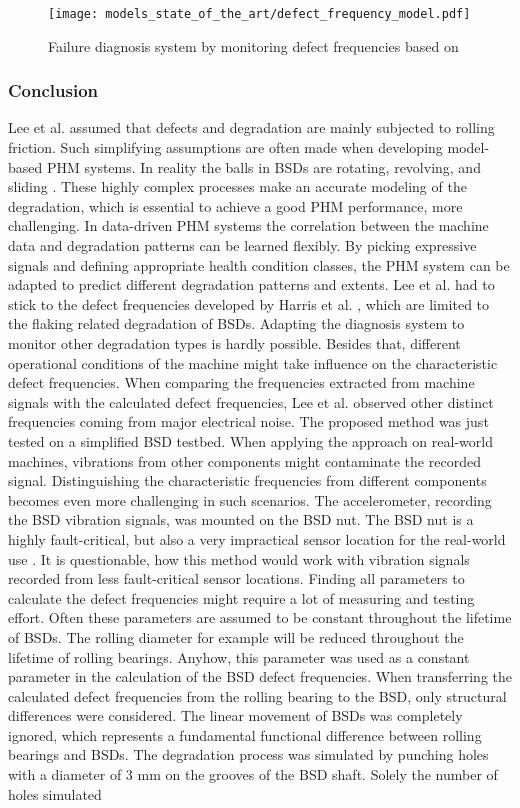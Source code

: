 \begin{figure}[H]
  \centering
  \texttt{[image: models\_state\_of\_the\_art/defect\_frequency\_model.pdf]}
  \caption{Failure diagnosis system by monitoring defect frequencies based on \cite{Lee2015}}
  \label{fig:defect_frequency_model}
\end{figure}

\subsubsection{Conclusion}
Lee et al. \cite{Lee2015} assumed that defects and degradation are mainly subjected to rolling friction. Such simplifying assumptions are often made when developing model-based PHM systems. In reality the balls in BSDs are rotating, revolving, and sliding \cite{Lee2015}. These highly complex processes make an accurate modeling of the degradation, which is essential to achieve a good PHM performance, more challenging. In data-driven PHM systems the correlation between the machine data and degradation patterns can be learned flexibly. By picking expressive signals and defining appropriate health condition classes, the PHM system can be adapted to predict different degradation patterns and extents. Lee et al. \cite{Lee2015} had to stick to the defect frequencies developed by Harris et al. \cite{Harris1996}, which are limited to the flaking related degradation of BSDs. Adapting the diagnosis system to monitor other degradation types is hardly possible. Besides that, different operational conditions of the machine might take influence on the characteristic defect frequencies. When comparing the frequencies extracted from machine signals with the calculated defect frequencies, Lee et al. observed other distinct frequencies coming from major electrical noise. The proposed method was just tested on a simplified BSD testbed. When applying the approach on real-world machines, vibrations from other components might contaminate the recorded signal. Distinguishing the characteristic frequencies from different components becomes even more challenging in such scenarios. The accelerometer, recording the BSD vibration signals, was mounted on the BSD nut. The BSD nut is a highly fault-critical, but also a very impractical sensor location for the real-world use \cite{Pandhare2021}. It is questionable, how this method would work with vibration signals recorded from less fault-critical sensor locations. Finding all parameters to calculate the defect frequencies might require a lot of measuring and testing effort. Often these parameters are assumed to be constant throughout the lifetime of BSDs. The rolling diameter for example will be reduced throughout the lifetime of rolling bearings. Anyhow, this parameter was used as a constant parameter in the calculation of the BSD defect frequencies. When transferring the calculated defect frequencies from the rolling bearing to the BSD, only structural differences were considered. The linear movement of BSDs was completely ignored, which represents a fundamental functional difference between rolling bearings and BSDs. The degradation process was simulated by punching holes with a diameter of 3 mm on the grooves of the BSD shaft. Solely the number of holes simulated 